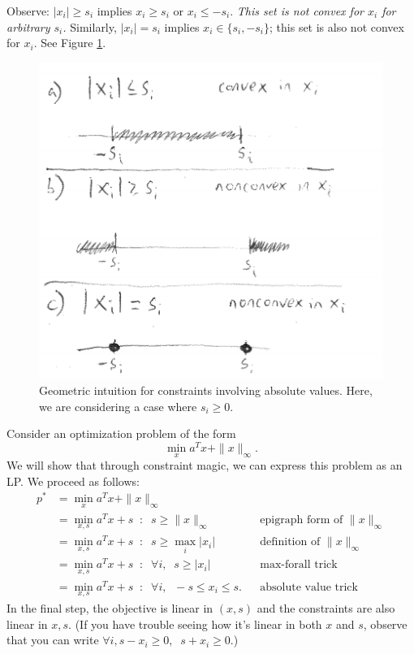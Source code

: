 \documentclass[12pt]{article}
\begin{document}
\begin{itemize}
Observe: $|x_i| \geq s_i$ implies $x_i \geq s_i$ or $x_i \leq -s_i$. \textit{This set is not convex for $x_i$ for arbitrary $s_i$.} Similarly, $|x_i| = s_i$ implies $x_i \in \{s_i, -s_i\}$; this set is also not convex for $x_i$. See Figure \ref{absval}.

\begin{figure}
\centering
\includegraphics[width=0.5\linewidth]{images/abs_val_trick.png}
\caption{Geometric intuition for constraints involving absolute values. Here, we are considering a case where $s_i \geq 0$.}
\label{absval}
\end{figure}

\end{itemize}

\begin{example} Consider an optimization problem of the form 
%
\begin{equation*}
\min_{x} a^T x + \|x\|_{\infty}.
\end{equation*}
%
We will show that through constraint magic, we can express this problem as an LP. We proceed as follows:
%
\begin{align*}
p^* &= \min_{x} a^T x + \|x\|_{\infty} \\
&= \min_{x,s} a^T x + s \;\; : \;\; s\geq \|x\|_{\infty} && \text{epigraph form of }\|x\|_{\infty}\\
&= \min_{x,s} a^T x + s \;\; : \;\; s\geq \max_i |x_i| && \text{definition of } \|x\|_{\infty}\\
&= \min_{x,s} a^T x + s \;\; : \;\; \forall i, \;\; s\geq |x_i| && \text{max-forall trick}\\
&= \min_{x,s} a^T x + s \;\; : \;\; \forall i, \;\; -s\leq x_i \leq s. && \text{absolute value trick}
\end{align*}
%
In the final step, the objective is linear in $(x,s)$ and the constraints are also linear in $x, s$. (If you have trouble seeing how it's linear in both $x$ and $s$, observe that you can write $\forall i, s - x_i \geq 0, \;\; s + x_i \geq 0$.)


\end{example}
\end{document}
